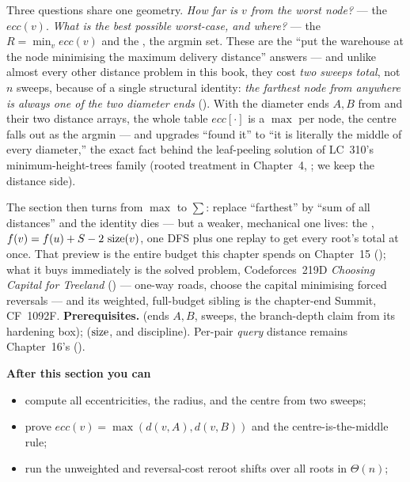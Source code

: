 \begin{topicintro}
Three questions share one geometry. \emph{How far is $v$ from the worst node?} ---
the  $\mathit{ecc}(v)$. \emph{What is the best possible worst-case,
and where?} --- the  $R = \min_v \mathit{ecc}(v)$ and the ,
the argmin set. These are the ``put the warehouse at the node minimising the maximum
delivery distance'' answers --- and unlike almost every other distance problem in
this book, they cost \emph{two sweeps total}, not $n$ sweeps, because of a single
structural identity: \emph{the farthest node from anywhere is always one of the two
diameter ends} (). With the diameter ends $A, B$ from
 and their two distance arrays, the whole table
$\mathit{ecc}[\cdot]$ is a $\max$ per node, the centre falls out as the argmin --- and
 upgrades ``found it'' to ``it is literally the middle of every
diameter,'' the exact fact behind the leaf-peeling solution of LC~310's
minimum-height-trees family (rooted treatment in Chapter~4, ; we keep the
distance side).

The section then turns from $\max$ to $\sum$: replace ``farthest'' by ``sum of all
distances'' and the identity dies --- but a weaker, mechanical one lives: the
, $f(v) = f(u) + S - 2\,\operatorname{size}(v)$, one DFS plus one replay to get
every root's total at once. That preview is the entire budget this chapter spends on
Chapter~15 (); what it buys immediately is the solved problem, Codeforces~219D
\emph{Choosing Capital for Treeland} () --- one-way roads, choose
the capital minimising forced reversals --- and its weighted, full-budget sibling is
the chapter-end Summit, CF~1092F.
\textbf{Prerequisites.}  (ends $A,B$, sweeps, the branch-depth
claim from its hardening box);  ($\operatorname{size}$, and 
discipline). Per-pair \emph{query} distance remains Chapter~16's ().

\textbf{After this section you can}
\begin{itemize}[nosep]
  \item compute all eccentricities, the radius, and the centre from two sweeps; \hfill{}
  \item prove $\mathit{ecc}(v)=\max(d(v,A),d(v,B))$ and the centre-is-the-middle rule; \hfill{}
  \item run the unweighted and reversal-cost reroot shifts over all roots in $\Theta(n)$; \hfill{}
\end{itemize}
\end{topicintro}

